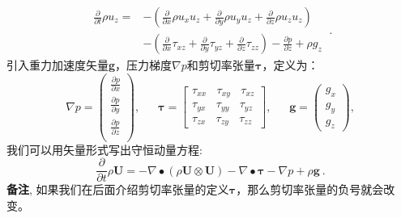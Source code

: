 \documentclass[MathematicsNumericsDerivationsAndOpenFOAM.tex]{subfiles}
\begin{document}
\begin{equation}
\boxed{
\begin{aligned}
  \frac{\partial}{\partial t} \rho u_z
=
 &-\left(
      \frac{\partial}{\partial x} \rho u_x u_z
      +\frac{\partial}{\partial y} \rho u_y u_z
      +\frac{\partial}{\partial z} \rho u_z u_z
  \right)\\
 &-\left(
      \frac{\partial}{\partial x}  \tau_{xz}
      +\frac{\partial}{\partial y}  \tau_{yz}
      +\frac{\partial}{\partial z}  \tau_{zz}
  \right)
  -
  \frac{\partial p}{\partial z}
  +
  \rho g_z
  \label{EQUATION::momentumZ}
\end{aligned}
}~.
\end{equation}
%
%
	引入重力加速度矢量\textbf{g}，压力梯度$\nabla p$和剪切率张量$\boldsymbol \tau$，定义为：
%
%
\begin{equation*}
    \nabla p
=
\left(
  \begin{matrix}
    \frac{\partial p}{\partial x} \\
    \frac{\partial p}{\partial y} \\
    \frac{\partial p}{\partial z} \\
  \end{matrix}
  \right),
  ~ ~ ~ ~ ~ ~ ~
\boldsymbol \tau
=
\left[
 \begin{matrix}
  \tau_{xx} ~~~~ \tau_{xy} ~~~~ \tau_{xz} \\
  \tau_{yx} ~~~~ \tau_{yy} ~~~~ \tau_{yz} \\
  \tau_{zx} ~~~~ \tau_{zy} ~~~~ \tau_{zz}
 \end{matrix}
\right],
  ~ ~ ~ ~ ~ ~ ~
\textbf{g}
=
\left(
 \begin{matrix}
  g_x \\
  g_y \\
  g_z
 \end{matrix}
\right),
\end{equation*}
%
%
	我们可以用矢量形式写出守恒动量方程:
%
%
\begin{equation}
 \boxed{
    \frac{\partial}{\partial t} \rho \textbf{U}
=
    -   \nabla \bullet \left(\rho\textbf{U} \otimes \textbf{U}\right)
    -   \nabla \bullet \boldsymbol \tau
    -   \nabla p
    + \rho\textbf{g}
 }~.
 \label{EQUATION::momentumDiv}
\end{equation}
%
%
    \textbf{备注},   如果我们在后面介绍剪切率张量的定义$\boldsymbol \tau$，那么剪切率张量的负号就会改变。
%
%
%
%
%
\end{document}
